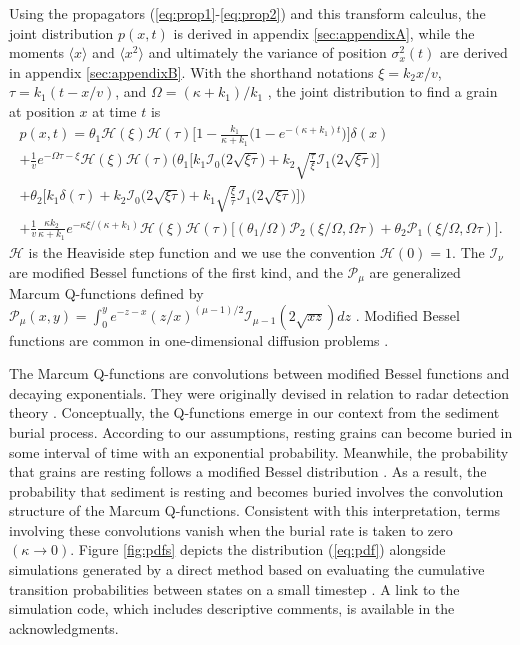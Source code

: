 \documentclass[draft,grl]{agujournal2018}
\newcommand\bra{\langle}
\newcommand\ket{\rangle}
\begin{document}
Using the propagators (\ref{eq:prop1}-\ref{eq:prop2}) and this transform calculus, the joint distribution $p(x,t)$ is derived in appendix \ref{sec:appendixA}, while the moments $\bra x \ket$ and $\bra x^2 \ket$ and ultimately the variance of position $\sigma_x^2(t)$ are derived in appendix \ref{sec:appendixB}. With the shorthand notations $\xi = k_2 x/v$, $\tau = k_1(t-x/v)$, and $\Omega = (\kappa+k_1)/k_1$ \citep[cf.,][]{Lisle1998}, the joint distribution to find a grain at position $x$ at time $t$ is 
\begin{multline}
p(x,t) = \theta_1\mathcal{H}(\xi)\mathcal{H}(\tau)\Big[1-\frac{k_1}{\kappa+k_1}\Big(1-e^{-(\kappa+k_1)t}\Big)\Big]\delta(x) \\ + \frac{1}{v}e^{-\Omega \tau - \xi}\mathcal{H}(\xi)\mathcal{H}(\tau)\Big(\theta_1\Big[k_1\mathcal{I}_0\big(2\sqrt{\xi\tau}\big) + k_2\sqrt{\frac{\tau}{\xi}}\mathcal{I}_1\big(2\sqrt{\xi\tau}\big)\Big] \\ + \theta_2\Big[k_1\delta(\tau) + k_2 \mathcal{I}_0\big(2\sqrt{\xi\tau}\big)+k_1 \sqrt{\frac{\xi}{\tau}}\mathcal{I}_1\big(2\sqrt{\xi\tau}\big)\Big]\Big) \\
+ \frac{1}{v}\frac{\kappa k_2}{\kappa + k_1}e^{-\kappa \xi/(\kappa + k_1)}\mathcal{H}(\xi)\mathcal{H}(\tau)\Big[(\theta_1/\Omega)\mathcal{P}_2(\xi/\Omega,\Omega\tau) + \theta_2 \mathcal{P}_1(\xi/\Omega,\Omega\tau)\Big].
\label{eq:pdf}
\end{multline}
$\mathcal{H}$ is the Heaviside step function and we use the convention $\mathcal{H}(0)=1$.
The $\mathcal{I}_\nu$ are modified Bessel functions of the first kind, and the $\mathcal{P}_\mu$ are generalized Marcum Q-functions defined by $\mathcal{P}_\mu(x,y) = \int_0^y e^{-z-x}(z/x)^{(\mu-1)/2}\mathcal{I}_{\mu-1}(2\sqrt{xz})dz $ \citep{Temme1996}. Modified Bessel functions are common in one-dimensional diffusion problems \citep[e.g.,][]{Einstein1937,Giddings1955,Daly2010}. 

The Marcum Q-functions are convolutions between modified Bessel functions and decaying exponentials. They were originally devised in relation to radar detection theory \citep{Marcum1960}. 
Conceptually, the Q-functions emerge in our context from the sediment burial process. According to our assumptions, resting grains can become buried in some interval of time with an exponential probability. Meanwhile, the probability that grains are resting follows a modified Bessel distribution \citep[e.g.,][]{Einstein1937,Lisle1998}.
As a result, the probability that sediment is resting and becomes buried involves the convolution structure of the Marcum Q-functions.
Consistent with this interpretation, terms involving these convolutions vanish when the burial rate is taken to zero $(\kappa \rightarrow 0)$.
Figure \ref{fig:pdfs} depicts the distribution (\ref{eq:pdf}) alongside simulations generated by a direct method based on evaluating the cumulative transition probabilities between states on a small timestep \citep[cf.,][]{Barik2006}. A link to the simulation code, which includes descriptive comments, is available in the acknowledgments.
\end{document}
